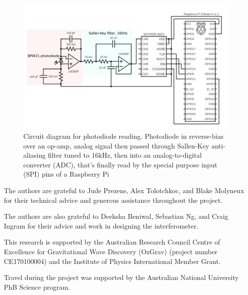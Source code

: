 \documentclass[prb,preprint]{revtex4-1}
\begin{document}
\begin{figure}%
	\includegraphics[width=\textwidth]{figures/circuit_diagram_2.pdf}
	\caption{Circuit diagram for photodiode reading. Photodiode in reverse-bias over an op-amp, analog signal then passed through Sallen-Key anti-aliasing filter tuned to 16kHz, then into an analog-to-digital converter (ADC), that’s finally read by the special purpose input (SPI) pins of a Raspberry Pi}
	\label{fig:circuit_diagram}
\end{figure}



\begin{acknowledgments}
The authors are grateful to Jude Prezens, Alex Tolotchkoc, and Blake Molyneux for their technical advice and generous assistance throughout the project.
	
The authors are also grateful to Deeksha Beniwal, Sebastian Ng, and Craig Ingram for their advice and work in designing the interferometer. 

This research is supported by the Australian Research Council Centre of Excellence for Gravitational Wave Discovery (OzGrav) (project number CE170100004) and the Institute of Physics International Member Grant.

Travel during the project was supported by the Australian National University PhB Science  program.

\end{acknowledgments}




\end{document}
